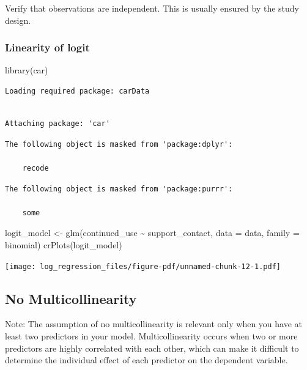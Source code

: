 \documentclass[
  letterpaper,
  DIV=11,
  numbers=noendperiod]{scrreprt}
\newenvironment{Shaded}{\begin{snugshade}}{\end{snugshade}}
\newcommand{\AttributeTok}[1]{\textcolor[rgb]{0.40,0.45,0.13}{#1}}
\newcommand{\FunctionTok}[1]{\textcolor[rgb]{0.28,0.35,0.67}{#1}}
\newcommand{\NormalTok}[1]{\textcolor[rgb]{0.00,0.23,0.31}{#1}}
\newcommand{\OtherTok}[1]{\textcolor[rgb]{0.00,0.23,0.31}{#1}}
\newcommand{\SpecialCharTok}[1]{\textcolor[rgb]{0.37,0.37,0.37}{#1}}
\begin{document}
Verify that observations are independent. This is usually ensured by the
study design.

\subsubsection{Linearity of logit}\label{linearity-of-logit}

\begin{Shaded}
\begin{Highlighting}[]
\FunctionTok{library}\NormalTok{(car)}
\end{Highlighting}
\end{Shaded}

\begin{verbatim}
Loading required package: carData
\end{verbatim}

\begin{verbatim}

Attaching package: 'car'
\end{verbatim}

\begin{verbatim}
The following object is masked from 'package:dplyr':

    recode
\end{verbatim}

\begin{verbatim}
The following object is masked from 'package:purrr':

    some
\end{verbatim}

\begin{Shaded}
\begin{Highlighting}[]
\NormalTok{logit\_model }\OtherTok{\textless{}{-}} \FunctionTok{glm}\NormalTok{(continued\_use }\SpecialCharTok{\textasciitilde{}}\NormalTok{ support\_contact, }\AttributeTok{data =}\NormalTok{ data, }\AttributeTok{family =}\NormalTok{ binomial)}
\FunctionTok{crPlots}\NormalTok{(logit\_model)}
\end{Highlighting}
\end{Shaded}

\texttt{[image: log\_regression\_files/figure-pdf/unnamed-chunk-12-1.pdf]}

\subsection{No Multicollinearity}\label{no-multicollinearity}

Note: The assumption of no multicollinearity is relevant only when you
have at least two predictors in your model. Multicollinearity occurs
when two or more predictors are highly correlated with each other, which
can make it difficult to determine the individual effect of each
predictor on the dependent variable.
\end{document}
